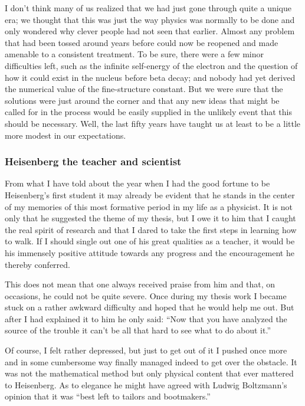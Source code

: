 \documentclass[12pt]{article}
\begin{document}
I don't think many of us realized that we had just gone through quite a unique era; we thought that this was just the way physics was normally to be done and only
wondered why clever people had not seen that earlier. Almost any problem that had been tossed around years before could now be reopened and made amenable to a consistent treatment. To be sure, there were a few minor difficulties left, such as the infinite self-energy of the electron and the question of how it could exist in the nucleus before beta decay; and nobody had yet derived the numerical value of the fine-structure constant. But we were sure that the solutions were just around the corner and that any new ideas that might be called for in the process would be easily supplied in the unlikely event that this should be necessary. Well, the last fifty years have taught us at least to be a little more modest in our expectations.

\subsubsection*{Heisenberg the teacher and scientist}

From what I have told about the year when I had the good fortune to be Heisenberg's first student it may already be evident that he stands in the center of my memories of this most formative period in my life as a physicist. It is not only that he suggested the theme of my thesis, but I owe it to him that I caught the real spirit of research and that I dared to take the first steps in learning how to walk. If I should single out one of his great qualities as a teacher, it would be his immensely positive attitude towards any progress and the encouragement he thereby conferred.

This does not mean that one always received praise from him and that, on occasions, he could not be quite severe. Once during my thesis work I became stuck on a rather awkward difficulty and hoped that he would help me out. But
after I had explained it to him he only said: ``Now that you have analyzed the source of the trouble it can't be all that hard to see what to do about it.''

Of course, I felt rather depressed, but just to get out of it I pushed once more and in some cumbersome way finally managed indeed to get over the obstacle. It was not the mathematical method but only physical content that ever mattered to Heisenberg. As to elegance he might have agreed with Ludwig Boltzmann's opinion that it was ``best left to tailors and bootmakers.''
\end{document}
